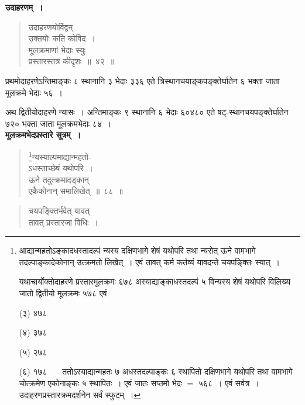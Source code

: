 \documentclass[11pt, openany]{book}
\begin{document}
\textbf{उदाहरणम्~।}

\begin{quote}
{\ex उदाहरणयोर्विद्वन्\\
उक्तयोः कति कोविद~।\\
मूलक्रमाणां भेदाः स्युः\\
प्रस्तारस्तत्र कीदृशः~॥~४२~॥}	
\end{quote}

\newpage

प्रथमोदाहरणेऽन्तिमाङ्कः ८ स्थानानि ३ भेदाः ३३६ एते त्रिस्थानचयाङ्कपङ्क्तेर्घातेन ६ भक्ता जाता मूलक्रमे भेदाः ५६~।
\vspace{2mm}

अथ द्वितीयोदाहरणे न्यासः~। अन्तिमाङ्कः ९ स्थानानि ६ भेदाः ६०४८० एते षट्-स्थानचयपङ्क्तेर्घातेन ७२० भक्ता जाता मूलक्रमभेदाः ८४~।\\

\textbf{मूलक्रमभेदप्रस्तारे सूत्रम्~।}

\begin{quote}
\renewcommand{\thefootnote}{१}\footnote{आद्यान्महतोऽङ्कादधस्तादल्पं न्यस्य दक्षिणभागे शेषं यथोपरि तथा न्यसेत् ऊने वामभागे तदल्पाङ्कादेकोनान् उत्क्रमतो लिखेत्~। एवं तावत् कर्म कर्तव्यं यावदन्ते चयपङ्क्तिः स्यात्~।
	
\hspace{3mm} यथाचार्योक्तोदाहरणे प्रस्तारमूलक्रमः ६७८ अस्याद्याङ्काधस्तदल्पं ५ विन्यस्य शेषं यथोपरि विलिख्य जातो द्वितीयो मूलक्रमः ५७८ एवं

\hspace{3mm} (३) ४७८

\hspace{3mm} (४) ३७८

\hspace{3mm} (५) २७८

\hspace{3mm} (६) १७८ ~~~ततोऽस्याद्यान्महतः ७ अधस्तदल्पाङ्कः ६ स्थापितो दक्षिणभागे यथोपरि तथा वामभागे चोत्क्रमेण एकोनाङ्कः ५ स्थापितः~। एवं जातः सप्तमो भेदः $=$ ५६८~। एवं सर्वत्र~। उदाहरणप्रस्तारक्रमदर्शनेन सर्वं स्फुटम्~।}{\gk न्यस्याल्पमाद्यान्महतो-\\
ऽधस्ताच्छेषं यथोपरि~।\\
ऊने तदुत्क्रमादड्कान्\\
एकैकोनान् समालिखेत्~॥~८८~॥}
\end{quote}

\newpage

\begin{quote}
{\gk चयपङ्क्तिर्भवेत् यावत्\\
तावत् प्रस्तारजा विधिः~।}
\end{quote}
\end{document}
